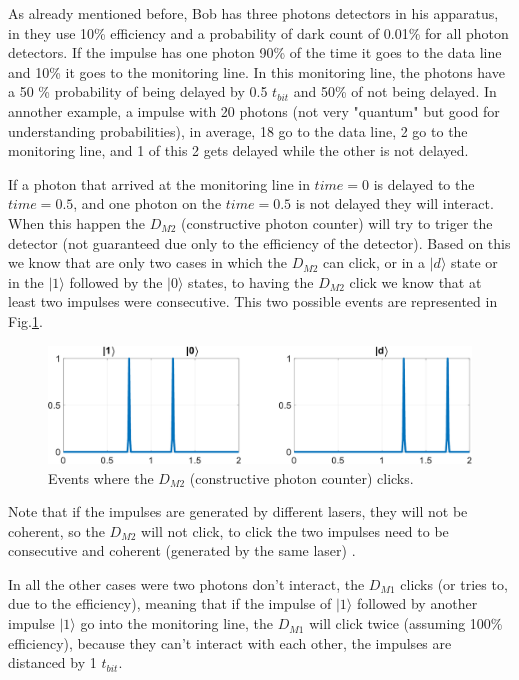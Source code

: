 \begin{refsection}
As already mentioned before, Bob has three photons detectors in his apparatus, in \cite{gisin2004towards} they use 10\% efficiency and a probability of dark count of 0.01\% for all photon detectors. If the impulse has one photon 90\% of the time it goes to the data line and 10\% it goes to the monitoring line. In this monitoring line, the photons have a 50 \% probability of being delayed by 0.5 $t_{bit}$ and 50\% of not being delayed.  In annother example, a impulse with 20 photons (not very "quantum" but good for understanding probabilities), in average, 18 go to the data line, 2 go to the monitoring line, and 1 of this 2 gets delayed while the other is not delayed.

If a photon that arrived at the monitoring line in $time=0$ is delayed to the $time=0.5$, and one photon on the $time=0.5$ is not delayed they will interact. When this happen the $D_{M2}$ (constructive photon counter) will try to triger the detector (not guaranteed due only to the efficiency of the detector). Based on this we know that are only two cases in which the $D_{M2}$ can click, or in a $|d\rangle$ state or in the $|1\rangle$ followed by the $|0\rangle$ states, to having the $D_{M2}$ click we know that at least two impulses were consecutive. This two possible events are represented in Fig.\ref{fig:dm2}.

\begin{figure}[hbt!]
\centering
\includegraphics[width=1\linewidth]{./sdf/tq_76558_cow_protocol/slides/figures/S2.pdf}
\caption{Events where the $D_{M2}$ (constructive photon counter) clicks.}
\label{fig:dm2}
\end{figure}

Note that if the impulses are generated by different lasers, they will not be coherent, so the $D_{M2}$ will not click, to click the two impulses need to be consecutive and coherent (generated by the same laser) \cite{rusca2018security}.

In all the other cases were two photons don't interact, the $D_{M1}$ clicks (or tries to, due to the efficiency), meaning that if the impulse of $|1\rangle$ followed by another impulse $|1\rangle$ go into the monitoring line, the $D_{M1}$ will click twice (assuming 100\% efficiency), because they can't interact with each other, the impulses are distanced by 1 $t_{bit}$.


\end{refsection}
